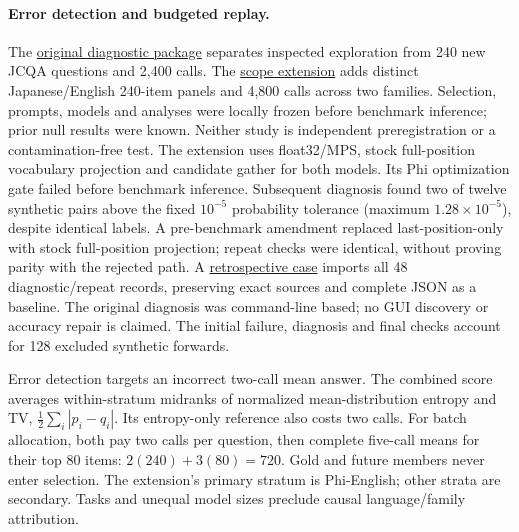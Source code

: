 \documentclass[11pt]{article}
\begin{document}
\paragraph{Error detection and budgeted replay.}
The \href{https://github.com/UpHash-Network/mini-jev/tree/research/naacl2027-demo/paper/naacl2027/diagnostic_value_20261003/publication}{original diagnostic package} separates inspected exploration from 240 new JCQA questions and 2,400 calls. The \href{https://github.com/UpHash-Network/mini-jev/tree/research/naacl2027-demo/paper/naacl2027/generality_20261003/publication}{scope extension} adds distinct Japanese/English 240-item panels and 4,800 calls across two families. Selection, prompts, models and analyses were locally frozen before benchmark inference; prior null results were known. Neither study is independent preregistration or a contamination-free test. The extension uses float32/MPS, stock full-position vocabulary projection and candidate gather for both models. Its Phi optimization gate failed before benchmark inference. Subsequent diagnosis found two of twelve synthetic pairs above the fixed $10^{-5}$ probability tolerance (maximum $1.28\times10^{-5}$), despite identical labels. A pre-benchmark amendment replaced last-position-only with stock full-position projection; repeat checks were identical, without proving parity with the rejected path. A \href{https://github.com/UpHash-Network/mini-jev/tree/research/naacl2027-demo/paper/naacl2027/case_study_20261003}{retrospective case} imports all 48 diagnostic/repeat records, preserving exact sources and complete JSON as a baseline. The original diagnosis was command-line based; no GUI discovery or accuracy repair is claimed. The initial failure, diagnosis and final checks account for 128 excluded synthetic forwards.

Error detection targets an incorrect two-call mean answer. The combined score averages within-stratum midranks of normalized mean-distribution entropy and TV, $\frac12\sum_i|p_i-q_i|$. Its entropy-only reference also costs two calls. For batch allocation, both pay two calls per question, then complete five-call means for their top 80 items: $2(240)+3(80)=720$. Gold and future members never enter selection. The extension's primary stratum is Phi-English; other strata are secondary. Tasks and unequal model sizes preclude causal language/family attribution.
\end{document}
